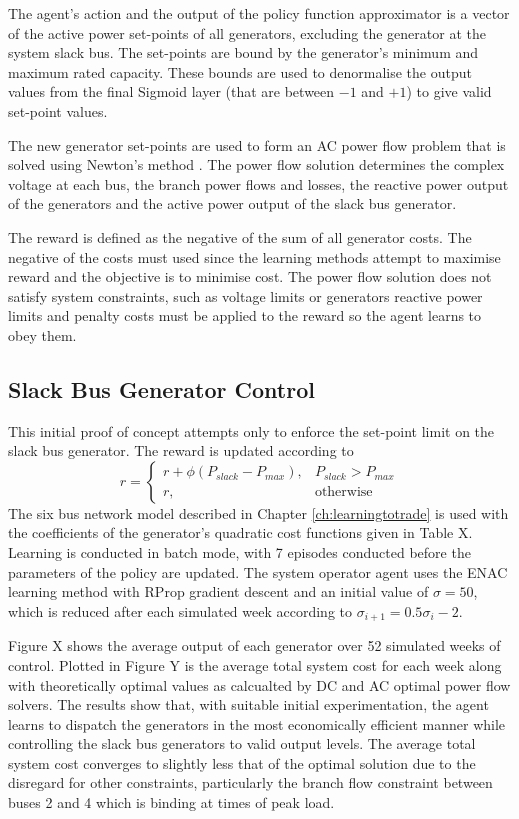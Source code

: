 The agent's action and the output of the policy function approximator is a
vector of the active power set-points of all generators, excluding the
generator at the system slack bus.  The set-points are bound by the generator's minimum
and maximum rated capacity. These bounds are used to denormalise the output
values from the final Sigmoid layer (that are between $-1$ and $+1$) to give
valid set-point values.

The new generator set-points are used to form an AC power flow problem that is
solved using Newton's method \cite{tinney:67}.  The power flow solution
determines the complex voltage at each bus, the branch power flows and losses,
the reactive power output of the generators and the active power output of the
slack bus generator.

The reward is defined as the negative of the sum of all generator costs.  The
negative of the costs must used since the learning methods attempt to maximise
reward and the objective is to minimise cost.  The power flow solution does not
satisfy system constraints, such as voltage limits or generators reactive power
limits and penalty costs must be applied to the reward so the agent learns to
obey them.

\subsection{Slack Bus Generator Control}
This initial proof of concept attempts only to enforce the set-point limit on
the slack bus generator.  The reward is updated according to
\begin{equation}
r =
\begin{cases}
r + \phi (P_{slack} - P_{max}), & \text{$P_{slack} > P_{max}$} \\
r, & \text{otherwise}
\end{cases}
\end{equation}
The six bus network model described in Chapter \ref{ch:learningtotrade} is used
with the coefficients of the generator's quadratic cost functions given in Table X.  Learning is conducted in batch
mode, with 7 episodes conducted before the parameters of the policy are
updated.  The system operator agent uses the ENAC learning method with RProp
gradient descent and an initial value of $\sigma = 50$, which is reduced after
each simulated week according to $\sigma_{i+1} = 0.5\sigma_i - 2$.

Figure X shows the average output of each generator over 52 simulated weeks of
control. Plotted in Figure Y is the average total system cost for each week along with
theoretically optimal values as calcualted by DC and AC optimal power flow
solvers.  The results show that, with suitable initial experimentation, the
agent learns to dispatch the generators in the most economically efficient
manner while controlling the slack bus generators to valid output levels.  The
average total system cost converges to slightly less that of the optimal
solution due to the disregard for other constraints, particularly the
branch flow constraint between buses 2 and 4 which is binding at times of peak
load.

